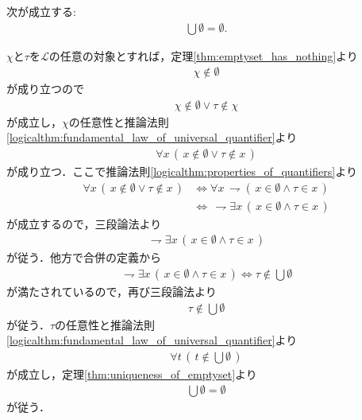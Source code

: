 	\begin{screen}
		\begin{thm}[空集合の合併は空]\label{thm:the_union_of_the_emptyset_is_empty}
			次が成立する:
			\begin{align}
				\bigcup \emptyset = \emptyset.
			\end{align}
		\end{thm}
	\end{screen}
	
	\begin{prf}
		$\chi$と$\tau$を$\mathcal{L}$の任意の対象とすれば，定理\ref{thm:emptyset_has_nothing}より
		\begin{align}
			\chi \notin \emptyset
		\end{align}
		が成り立つので
		\begin{align}
			\chi \notin \emptyset \vee \tau \notin \chi
		\end{align}
		が成立し，$\chi$の任意性と推論法則\ref{logicalthm:fundamental_law_of_universal_quantifier}より
		\begin{align}
			\forall x\, (\, x \notin \emptyset \vee \tau \notin x\, )
		\end{align}
		が成り立つ．ここで推論法則\ref{logicalthm:properties_of_quantifiers}より
		\begin{align}
			\forall x\, (\, x \notin \emptyset \vee \tau \notin x\, )
			&\Longleftrightarrow \forall x\, \rightharpoondown (\, x \in \emptyset \wedge \tau \in x\, ) \\
			&\Longleftrightarrow\, \rightharpoondown \exists x\, (\, x \in \emptyset \wedge \tau \in x\, )
		\end{align}
		が成立するので，三段論法より
		\begin{align}
			\rightharpoondown \exists x\, (\, x \in \emptyset \wedge \tau \in x\, )
		\end{align}
		が従う．他方で合併の定義から
		\begin{align}
			\rightharpoondown \exists x\, (\, x \in \emptyset \wedge \tau \in x\, )
			\Longleftrightarrow \tau \notin \bigcup \emptyset
		\end{align}
		が満たされているので，再び三段論法より
		\begin{align}
			\tau \notin \bigcup \emptyset
		\end{align}
		が従う．$\tau$の任意性と推論法則\ref{logicalthm:fundamental_law_of_universal_quantifier}より
		\begin{align}
			\forall t\, (\, t \notin \bigcup \emptyset\, )
		\end{align}
		が成立し，定理\ref{thm:uniqueness_of_emptyset}より
		\begin{align}
			\bigcup \emptyset = \emptyset
		\end{align}
		が従う．
		\QED
	\end{prf}
	
